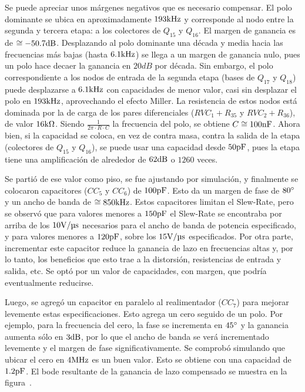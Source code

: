 Se puede apreciar unos márgenes negativos que es necesario compensar. El polo dominante se ubica en aproximadamente $193 \si[per-mode=symbol]{\kilo\hertz}$ y corresponde al nodo entre la segunda y tercera etapa: a los colectores de $Q_{15}$ y $Q_{16}$. El margen de ganancia es de $\cong -50.7 \si[per-mode=symbol]{\decibel}$. Desplazando al polo dominante una década y media hacia las frecuencias más bajas (hasta $6.1 \si[per-mode=symbol]{\kilo\hertz}$) se llega a un margen de ganancia nulo, pues un polo hace decaer la ganancia en $20dB$ por década. Sin embargo, el polo correspondiente a los nodos de entrada de la segunda etapa (bases de $Q_{17}$ y $Q_{18}$) puede desplazarse a $6.1 \si[per-mode=symbol]{\kilo\hertz}$ con capacidades de menor valor, casi sin desplazar el polo en $193 \si[per-mode=symbol]{\kilo\hertz}$, aprovechando el efecto Miller. 
La resistencia de estos nodos está dominada por la de carga de los pares diferenciales ($RVC_{1} + R_{35}$ y $RVC_{2} + R_{36}$), de valor $16 \si[per-mode=symbol]{\kilo\ohm}$. Siendo $\frac{1}{2 \pi \cdot R \cdot C}$ la frecuencia del polo, se obtiene $C \cong 100 \si[per-mode=symbol]{\nano\farad}$. Ahora bien, si la capacidad se coloca, en vez de contra masa, contra la salida de la etapa (colectores de $Q_{15}$ y $Q_{16}$), se puede usar una capacidad desde $50 \si[per-mode=symbol]{\pico\farad}$, pues la etapa tiene una amplificación de alrededor de $62 \si[per-mode=symbol]{\decibel}$ o $1260$ veces. 

Se partió de ese valor como piso, se fue ajustando por simulación, y finalmente se colocaron capacitores ($CC_{5}$ y $CC_{6}$) de $100 \si[per-mode=symbol]{\pico\farad}$. Esto da un margen de fase de $80 \si[per-mode=symbol]{\degree}$ y un ancho de banda de $\cong 850 \si[per-mode=symbol]{\kilo\hertz}$. Estos capacitores limitan el Slew-Rate, pero se observó que para valores menores a $150 \si[per-mode=symbol]{\pico\farad}$ el Slew-Rate se encontraba por arriba de los $10 \si[per-mode=symbol]{\volt\per\micro\second}$ necesarios para el ancho de banda de potencia especificado, y para valores menores a $120 \si[per-mode=symbol]{\pico\farad}$, sobre los $15 \si[per-mode=symbol]{\volt\per\micro\second}$ especificados. Por otra parte, incrementar este capacitor reduce la ganancia de lazo en frecuencias altas y, por lo tanto, los beneficios que esto trae a la distorsión, resistencias de entrada y salida, etc. Se optó por un valor de capacidades, con margen, que podría eventualmente reducirse.

Luego, se agregó un capacitor en paralelo al realimentador ($CC_{7}$) para mejorar levemente estas especificaciones. Esto agrega un cero seguido de un polo. Por ejemplo, para la frecuencia del cero, la fase se incrementa en $45 \si[per-mode=symbol]{\degree}$ y la ganancia aumenta sólo en $3 \si[per-mode=symbol]{\decibel}$, por lo que el ancho de banda se verá incrementado levemente y el margen de fase significativamente. Se comprobó simulando que ubicar el cero en $4 \si[per-mode=symbol]{\mega\hertz}$ es un buen valor. Esto se obtiene con una capacidad de $1.2 \si[per-mode=symbol]{\pico\farad}$. El bode resultante de la ganancia de lazo compensado se muestra en la figura~.


